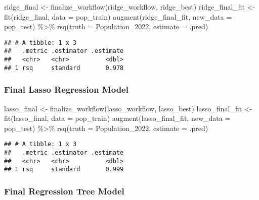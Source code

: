 \documentclass[
]{article}
\newenvironment{Shaded}{\begin{snugshade}}{\end{snugshade}}
\newcommand{\AttributeTok}[1]{\textcolor[rgb]{0.77,0.63,0.00}{#1}}
\newcommand{\FunctionTok}[1]{\textcolor[rgb]{0.00,0.00,0.00}{#1}}
\newcommand{\NormalTok}[1]{#1}
\newcommand{\OtherTok}[1]{\textcolor[rgb]{0.56,0.35,0.01}{#1}}
\newcommand{\SpecialCharTok}[1]{\textcolor[rgb]{0.00,0.00,0.00}{#1}}
\begin{document}
\begin{Shaded}
\begin{Highlighting}[]
\NormalTok{ridge\_final }\OtherTok{\textless{}{-}} \FunctionTok{finalize\_workflow}\NormalTok{(ridge\_workflow, ridge\_best)}
\NormalTok{ridge\_final\_fit }\OtherTok{\textless{}{-}} \FunctionTok{fit}\NormalTok{(ridge\_final, }\AttributeTok{data =}\NormalTok{ pop\_train)}
\FunctionTok{augment}\NormalTok{(ridge\_final\_fit, }\AttributeTok{new\_data =}\NormalTok{ pop\_test) }\SpecialCharTok{\%\textgreater{}\%}
  \FunctionTok{rsq}\NormalTok{(}\AttributeTok{truth =}\NormalTok{ Population\_2022, }\AttributeTok{estimate =}\NormalTok{ .pred)}
\end{Highlighting}
\end{Shaded}

\begin{verbatim}
## # A tibble: 1 x 3
##   .metric .estimator .estimate
##   <chr>   <chr>          <dbl>
## 1 rsq     standard       0.978
\end{verbatim}

\hypertarget{final-lasso-regression-model}{%
\subsubsection{Final Lasso Regression
Model}\label{final-lasso-regression-model}}

\begin{Shaded}
\begin{Highlighting}[]
\NormalTok{lasso\_final }\OtherTok{\textless{}{-}} \FunctionTok{finalize\_workflow}\NormalTok{(lasso\_workflow, lasso\_best)}
\NormalTok{lasso\_final\_fit }\OtherTok{\textless{}{-}} \FunctionTok{fit}\NormalTok{(lasso\_final, }\AttributeTok{data =}\NormalTok{ pop\_train)}
\FunctionTok{augment}\NormalTok{(lasso\_final\_fit, }\AttributeTok{new\_data =}\NormalTok{ pop\_test) }\SpecialCharTok{\%\textgreater{}\%}
  \FunctionTok{rsq}\NormalTok{(}\AttributeTok{truth =}\NormalTok{ Population\_2022, }\AttributeTok{estimate =}\NormalTok{ .pred)}
\end{Highlighting}
\end{Shaded}

\begin{verbatim}
## # A tibble: 1 x 3
##   .metric .estimator .estimate
##   <chr>   <chr>          <dbl>
## 1 rsq     standard       0.999
\end{verbatim}

\hypertarget{final-regression-tree-model}{%
\subsubsection{Final Regression Tree
Model}\label{final-regression-tree-model}}
\end{document}
